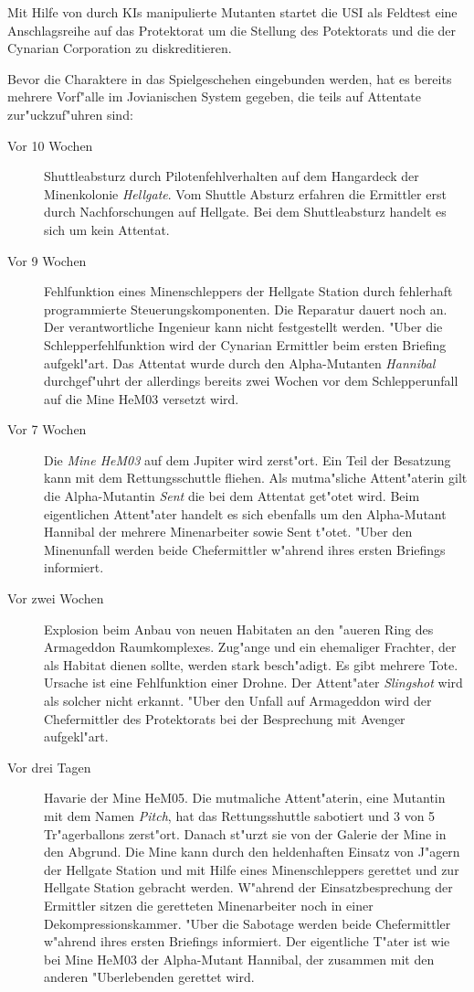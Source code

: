 
Mit Hilfe von durch KIs manipulierte Mutanten startet die USI als Feldtest eine Anschlagsreihe auf das Protektorat um die Stellung des Potektorats und die der Cynarian Corporation zu diskreditieren.

Bevor die Charaktere in das Spielgeschehen eingebunden werden, hat es bereits mehrere Vorf"alle im Jovianischen System gegeben, die teils auf Attentate zur"uckzuf"uhren sind:

\begin{description}
\item [Vor 10 Wochen] Shuttleabsturz durch Pilotenfehlverhalten auf dem Hangardeck der Minenkolonie \emph{Hellgate}. Vom Shuttle Absturz 
      erfahren die Ermittler erst durch Nachforschungen auf Hellgate. Bei dem Shuttleabsturz handelt es sich um kein Attentat.
\item [Vor 9 Wochen] Fehlfunktion eines Minenschleppers der Hellgate Station durch fehlerhaft programmierte Steuerungskomponenten. Die 
      Reparatur dauert noch an. Der verantwortliche Ingenieur kann nicht festgestellt werden. "Uber die Schlepperfehlfunktion wird der Cynarian Ermittler beim ersten Briefing aufgekl"art. Das Attentat wurde durch den Alpha-Mutanten \emph{Hannibal} durchgef"uhrt der allerdings bereits zwei Wochen vor dem Schlepperunfall auf die Mine HeM03 versetzt wird.      
\item [Vor 7 Wochen] Die \emph{Mine HeM03} auf dem Jupiter wird zerst"ort. Ein Teil der Besatzung kann mit dem  Rettungsschuttle fliehen. 
      Als mutma"sliche Attent"aterin gilt die Alpha-Mutantin \emph{Sent} die bei dem Attentat get"otet wird. Beim eigentlichen Attent"ater handelt es sich ebenfalls um den Alpha-Mutant Hannibal der mehrere Minenarbeiter sowie Sent t"otet. "Uber den Minenunfall werden beide Chefermittler w"ahrend ihres ersten Briefings informiert.
\item [Vor zwei Wochen] Explosion beim Anbau von neuen Habitaten an den "au\3eren Ring des Armageddon Raumkomplexes. Zug"ange und ein
      ehemaliger Frachter, der als Habitat dienen sollte, werden stark besch"adigt.  Es gibt mehrere Tote. Ursache ist eine Fehlfunktion einer Drohne. Der Attent"ater \emph{Slingshot} wird als solcher nicht erkannt. "Uber den Unfall auf Armageddon wird der Chefermittler des Protektorats bei der Besprechung mit Avenger aufgekl"art.
\item [Vor drei Tagen] Havarie der Mine HeM05. Die mutma\3liche Attent"aterin, eine Mutantin mit dem Namen \emph{Pitch}, hat das
      Rettungsshuttle sabotiert und 3 von 5 Tr"agerballons zerst"ort. Danach st"urzt sie von der Galerie der Mine in den Abgrund. Die Mine kann durch den heldenhaften Einsatz von J"agern der Hellgate Station und mit Hilfe eines Minenschleppers gerettet und zur Hellgate Station gebracht werden. W"ahrend der Einsatzbesprechung der Ermittler sitzen die geretteten Minenarbeiter noch in einer Dekompressionskammer. "Uber die Sabotage werden beide Chefermittler w"ahrend ihres ersten Briefings informiert. Der eigentliche
      T"ater ist wie bei Mine HeM03 der Alpha-Mutant Hannibal, der zusammen mit den anderen "Uberlebenden gerettet wird.
\end{description}


